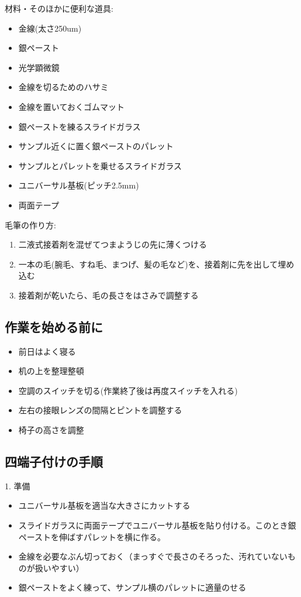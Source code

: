 \documentclass[11pt,a4paper]{jsarticle}
\begin{document}
材料・そのほかに便利な道具:
\begin{itemize}
\item 金線(太さ250um)
\item 銀ペースト
\item 光学顕微鏡
\item 金線を切るためのハサミ
\item 金線を置いておくゴムマット
\item 銀ペーストを練るスライドガラス
\item サンプル近くに置く銀ペーストのパレット
\item サンプルとパレットを乗せるスライドガラス
\item ユニバーサル基板(ピッチ2.5mm)
\item 両面テープ
\end{itemize}

毛筆の作り方:
\begin{enumerate}
\item 二液式接着剤を混ぜてつまようじの先に薄くつける
\item 一本の毛(腕毛、すね毛、まつげ、髪の毛など)を、接着剤に先を出して埋め込む
\item  接着剤が乾いたら、毛の長さをはさみで調整する
 \end{enumerate}

\subsection{作業を始める前に} 
\begin{itemize}
\item 前日はよく寝る
\item 机の上を整理整頓
\item 空調のスイッチを切る(作業終了後は再度スイッチを入れる)
\item 左右の接眼レンズの間隔とピントを調整する
\item 椅子の高さを調整
\end{itemize}

 
\subsection{四端子付けの手順} 
1. 準備
\begin{itemize}
\item ユニバーサル基板を適当な大きさにカットする
\item スライドガラスに両面テープでユニバーサル基板を貼り付ける。このとき銀ペーストを伸ばすパレットを横に作る。
\item 金線を必要なぶん切っておく（まっすぐで長さのそろった、汚れていないものが扱いやすい）
\item 銀ペーストをよく練って、サンプル横のパレットに適量のせる
\end{itemize}
 
\end{document}
